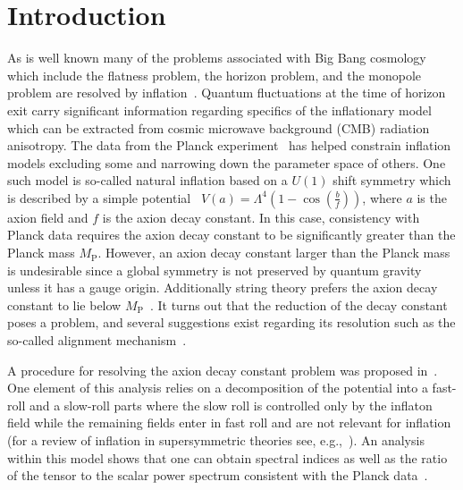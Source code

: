 \documentclass[12pt]{article}
\begin{document}
\section{Introduction \label{sec:Introduction}}
As is well known many of the problems associated with Big Bang cosmology which include
the flatness problem, the horizon problem, and the monopole problem are resolved by inflation~\cite{Guth:1980zm, Starobinsky:1980te, Linde:1981mu, Albrecht:1982wi, Sato:1980yn, Linde:1983gd}.
Quantum fluctuations at the time of horizon exit carry significant information regarding specifics of the inflationary model~\cite{Mukhanov:1981xt, Hawking:1982cz, Starobinsky:1982ee, Guth:1982ec, Bardeen:1983qw, Cheung:2007st} which can be extracted from cosmic microwave background (CMB) radiation anisotropy.
The data from the Planck experiment~\cite{Akrami:2018vks, Akrami:2018odb, Array:2015xqh} has helped constrain inflation models excluding some and narrowing down the parameter space of others.
One such model is so-called natural inflation based on a $U(1)$ shift symmetry which is described by a simple potential~\cite{Freese:1990rb, Adams:1992bn} $V\left(a\right) = \Lambda^4 \left(1 - \cos\left(\frac{b}{f}\right)\right)$, where $a$ is the axion field and $f$ is the axion decay constant.
In this case, consistency with Planck data requires the axion decay constant to be significantly greater than the Planck mass $M_\text{P}$.
However, an axion decay constant larger than the Planck mass is undesirable since a global symmetry is not preserved by quantum gravity unless it has a gauge origin.
Additionally string theory prefers the axion decay constant to lie below $M_\text{P}$~\cite{Banks:2003sx, Svrcek:2006yi}.
It turns out that the reduction of the decay constant poses a problem, and several suggestions exist regarding its resolution such as the so-called alignment mechanism~\cite{Kim:2004rp, Long:2014dta}.

A procedure for resolving the axion decay constant problem was proposed in~\cite{Nath:2017ihp}.
One element of this analysis relies on a decomposition of the potential into a fast-roll and a slow-roll parts where the slow roll is controlled only by the inflaton field while the remaining fields enter in fast roll and are not relevant for inflation~\cite{Nath:2017ihp} (for a review of inflation in supersymmetric theories see, e.g.,~\cite{Nath:2016qzm}).
An analysis within this model shows that one can obtain spectral indices as well as the ratio of the tensor to the scalar power spectrum consistent with the Planck data~\cite{Akrami:2018vks, Akrami:2018odb, Array:2015xqh}.
\end{document}
